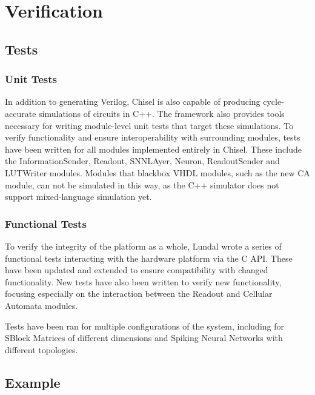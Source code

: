 
\chapter{Verification}
\label{chp:verification}



\section{Tests}
\label{sec:test}

\subsection{Unit Tests}
\label{sec:unit-tests}

In addition to generating Verilog, Chisel is also capable of producing
cycle-accurate simulations of circuits in C++. The framework also provides tools
necessary for writing module-level unit tests that target these simulations. To
verify functionality and ensure interoperability with surrounding modules, tests
have been written for all modules implemented entirely in Chisel. These include
the InformationSender, Readout, SNNLAyer, Neuron, ReadoutSender and LUTWriter
modules. Modules that blackbox VHDL modules, such as the new CA module, can not
be simulated in this way, as the C++ simulator does not support mixed-language
simulation yet.

\subsection{Functional Tests}
\label{sec:functional-test}

To verify the integrity of the platform as a whole, Lundal wrote a series of
functional tests interacting with the hardware platform via the C API. These
have been updated and extended to ensure compatibility with changed
functionality. New tests have also been written to verify new functionality,
focusing especially on the interaction between the Readout and Cellular Automata
modules.

Tests have been ran for multiple configurations of the system, including
for SBlock Matrices of different dimensions and Spiking Neural Networks with
different topologies.

\section{Example}
\label{sec:selfreg-example}


